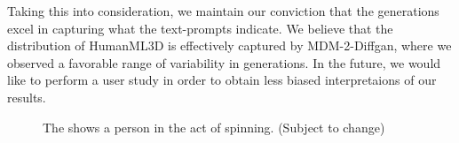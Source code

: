 \documentclass[10pt,twocolumn,letterpaper]{article}
\begin{document}
Taking this into consideration, we maintain our conviction that the generations excel in capturing what the text-prompts indicate. We believe that the 
distribution of HumanML3D is effectively captured by MDM-2-Diffgan, where we observed a favorable range of variability in generations. In the future, 
we would like to perform a user study in order to obtain less biased interpretaions of our results. 

\begin{figure}[h!]    
    \centering
    \caption{The shows a person in the act of spinning. (Subject to change)}    
    \label{fig:quant}
\end{figure}
\newpage
\end{document}
